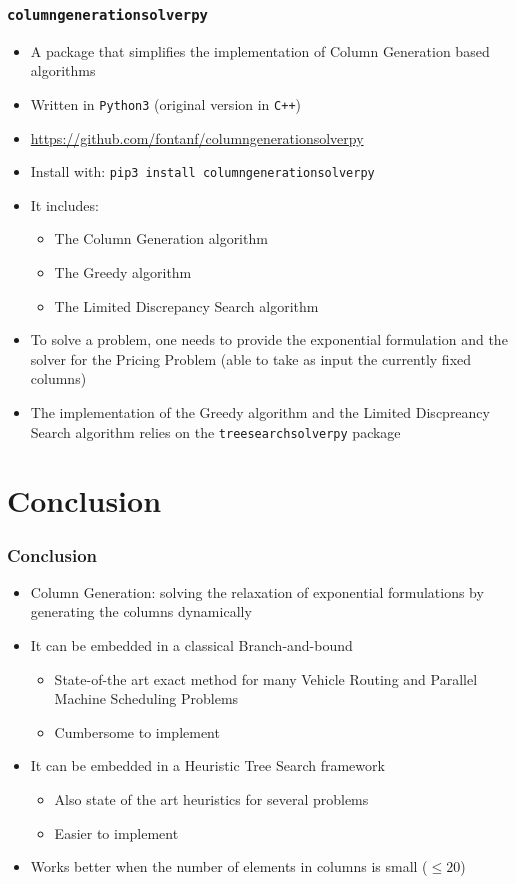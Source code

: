 \documentclass[10pt]{beamer}
\begin{document}
\begin{frame}
  \frametitle{\texttt{columngenerationsolverpy}}

  \begin{itemize}
    \item A package that simplifies the implementation of Column Generation based algorithms
    \item Written in \texttt{Python3} (original version in \texttt{C++})
    \item \url{https://github.com/fontanf/columngenerationsolverpy}
    \item Install with: \texttt{pip3 install columngenerationsolverpy}
    \item It includes:
      \begin{itemize}
        \item The Column Generation algorithm
        \item The Greedy algorithm
        \item The Limited Discrepancy Search algorithm
      \end{itemize}
    \item To solve a problem, one needs to provide the exponential formulation and the solver for the Pricing Problem (able to take as input the currently fixed columns)
    \item The implementation of the Greedy algorithm and the Limited Discpreancy Search algorithm relies on the \texttt{treesearchsolverpy} package
  \end{itemize}
\end{frame}

\section{Conclusion}

\begin{frame}
  \frametitle{Conclusion}

  \begin{itemize}
    \item Column Generation: solving the relaxation of exponential formulations by generating the columns dynamically
    \item It can be embedded in a classical Branch-and-bound
      \begin{itemize}
        \item State-of-the art exact method for many Vehicle Routing and Parallel Machine Scheduling Problems
        \item Cumbersome to implement
      \end{itemize}
    \item It can be embedded in a Heuristic Tree Search framework
      \begin{itemize}
        \item Also state of the art heuristics for several problems
        \item Easier to implement
      \end{itemize}
    \item Works better when the number of elements in columns is small ($\le 20$)
  \end{itemize}
\end{frame}

\maketitle
\end{document}
